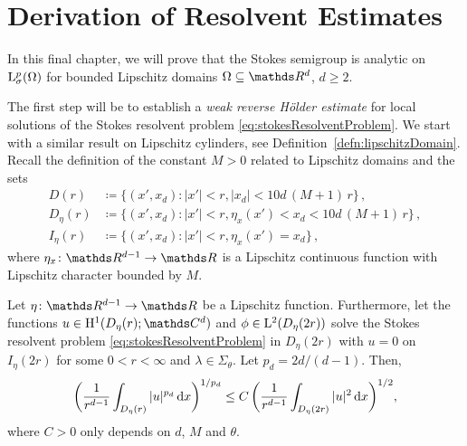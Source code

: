 \chapter{Derivation of Resolvent Estimates}
\label{chap:6}

In this final chapter, we will prove that the Stokes semigroup is analytic on $\mathrm{L}^p_\sigma(\Omega)$ for bounded Lipschitz domains $\Omega \subseteq \R^d$, $d \geq 2$.

The first step will be to establish a \emph{weak reverse Hölder estimate} for local solutions of the Stokes resolvent problem \eqref{eq:stokesResolventProblem}. 
We start with a similar result on Lipschitz cylinders, see Definition~\ref{defn:lipschitzDomain}.
Recall the definition of the constant $M > 0$ related to Lipschitz domains and the sets
  \begin{align*}
    D(r) &\coloneqq \big\{ (x', x_d) \colon |x'| < r, |x_d| < 10 d\, (M + 1)\, r\big\}\,, \\
    D_{\eta}(r) &\coloneqq \big\{ (x', x_d) \colon |x'| < r, \eta_x(x') < x_d < 10 d\,(M+ 1)\,r\big\}\,, \\
    I_{\eta}(r) &\coloneqq \big\{ (x', x_d) \colon |x'| < r, \eta_x(x') = x_d \big\}\,,
  \end{align*}
  where $\eta_x \colon \R^{d - 1} \to \R$ is a Lipschitz continuous function with Lipschitz character bounded by $M$.

\begin{lem}
  \label{lem:reverseHoelderCylinder}
  Let $\eta \colon \R^{d - 1} \to \R$ be a Lipschitz function.
  Furthermore, let the functions $u \in \HH^1(D_\eta(r); \C^d)$ and $\phi \in \mathrm{L}^2(D_\eta(2r))$ solve the Stokes resolvent problem \eqref{eq:stokesResolventProblem} in $D_\eta(2r)$ with $u = 0$ on $I_\eta(2r)$ for some $0 < r < \infty$ and $\lambda \in \Sigma_\theta$.
  Let $p_d = {2d}/(d - 1)$.
  Then,
  \begin{align}
    \label{eq:reverseHoelderCylinder}
    \bigg( \frac{1}{r^{d -1 }}\int_{D_\eta(r)} |u|^{p_d} \, {\operatorname{d}\!{x}} \bigg)^{1/p_d} \leq C \, \bigg( \frac{1}{r^{d - 1}} \int_{D_\eta(2r)} |u|^2 \, {\operatorname{d}\!{x}} \bigg)^{1/2},
  \end{align}
  where $C > 0$ only depends on $d$, $M$ and $\theta$.
\end{lem}

